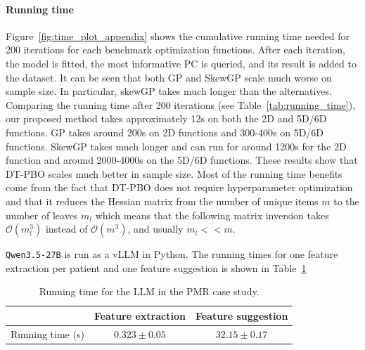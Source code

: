 \documentclass{article}
\begin{document}
\paragraph{Running time}
Figure~\ref{fig:time_plot_appendix} shows the cumulative running time needed for 200 iterations for each benchmark optimization functions. After each iteration, the model is fitted, the most informative PC is queried, and its result is added to the dataset. It can be seen that both GP and SkewGP scale much worse on sample size. In particular, skewGP takes much longer than the alternatives. Comparing the running time after 200 iterations (see Table~\ref{tab:running_time}), our proposed method takes approximately 12s on both the 2D and 5D/6D functions. GP takes around 200s on 2D functions and 300-400s on 5D/6D functions. SkewGP takes much longer and can run for around 1200s for the 2D function and around 2000-4000s on the 5D/6D functions. These results show that DT-PBO scales much better in sample size. Most of the running time benefits come from the fact that DT-PBO does not require hyperparameter optimization and that it reduces the Hessian matrix from the number of unique items $m$ to the number of leaves $m_l$ which means that the following matrix inversion takes $\mathcal{O}(m_l^3)$ instead of $\mathcal{O}(m^3)$, and usually $m_l << m$.

\texttt{Qwen3.5-27B} is run as a vLLM in Python. The running times for one feature extraction per patient and one feature suggestion is shown in Table~\ref{tab:time_llm}

\begin{table}[h]
    \caption{Running time for the LLM in the PMR case study.}
    \centering
\begin{tabular}{lcc}
\toprule
 & \textbf{Feature extraction} & \textbf{Feature suggestion} \\
\midrule
        Running time (s) & $0.323 \pm 0.05$  & $32.15 \pm 0.17$ \\
    \end{tabular}
    \label{tab:time_llm}
\end{table}
\end{document}
